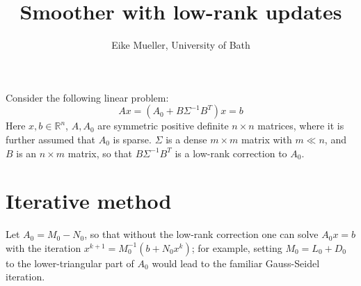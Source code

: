 \documentclass[11pt]{article}
\title{Smoother with low-rank updates}
\author{Eike Mueller, University of Bath}
\begin{document}
\maketitle
Consider the following linear problem:
\begin{equation}
    Ax = \left(A_0 + B \Sigma^{-1} B^T \right)x = b\label{eqn:linear_system}
\end{equation}
Here $x,b\in\mathbb{R}^n$, $A,A_0$ are symmetric positive definite $n\times n$ matrices, where it is further assumed that $A_0$ is sparse. $\Sigma$ is a dense $m\times m$ matrix with $m\ll n$, and $B$ is an $n\times m$ matrix, so that $B\Sigma^{-1}B^T$ is a low-rank correction to $A_0$.
\section{Iterative method}
Let $A_0 = M_0-N_0$, so that without the low-rank correction one can solve $A_0x=b$ with the iteration $x^{k+1} = M_0^{-1}(b + N_0x^k)$; for example, setting $M_0 = L_0 + D_0$ to the lower-triangular part of $A_0$ would lead to the familiar Gauss-Seidel iteration.
\end{document}
